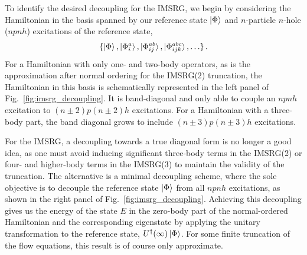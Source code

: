To identify the desired decoupling for the IMSRG,
we begin by considering the Hamiltonian in the basis spanned by
our reference state $\ket{\Phi}$ and
$n$-particle $n$-hole ($npnh$) excitations of the reference state,
\begin{equation}
  \{\ket{\Phi}, \ket{\Phi_{i}^{a}}, \ket{\Phi_{ij}^{ab}}, \ket{\Phi_{ijk}^{abc}}, \ldots \}\,.
\end{equation}
For a Hamiltonian with only one- and two-body operators,
as is the approximation after normal ordering for the IMSRG(2) truncation,
the Hamiltonian in this basis is schematically represented
in the left panel of Fig.~\ref{fig:imsrg_decoupling}.
It is band-diagonal and only able to couple an $npnh$ excitation
to $(n\pm2)p(n\pm2)h$ excitations.
For a Hamiltonian with a three-body part,
the band diagonal grows to include $(n\pm3)p(n\pm3)h$ excitations.

For the IMSRG,
a decoupling towards a true diagonal form is no longer a good idea,
as one must avoid inducing significant three-body terms in the IMSRG(2)
or four- and higher-body terms in the IMSRG(3)
to maintain the validity of the truncation.
The alternative is a minimal decoupling scheme,
where the sole objective is to decouple the reference state $\ket{\Phi}$
from all $npnh$ excitations,
as shown in the right panel of Fig.~\ref{fig:imsrg_decoupling}.
Achieving this decoupling gives us the energy of the state $E$
in the zero-body part of the normal-ordered Hamiltonian
and the corresponding eigenstate by applying the unitary transformation
to the reference state, $U^{\dagger}(\infty)\ket{\Phi}$.
For some finite truncation of the flow equations,
this result is of course only approximate.

